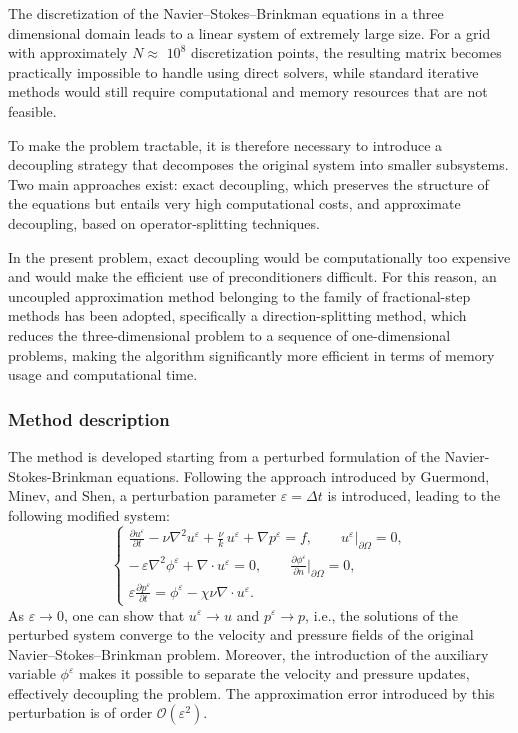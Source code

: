 \documentclass[12pt]{article}
\begin{document}
The discretization of the Navier–Stokes–Brinkman equations in a three dimensional domain leads to a linear system of extremely large size. For a grid with approximately $N \approx $ $10^8$  discretization points, the resulting matrix becomes practically impossible to handle using direct solvers, while standard iterative methods would still require computational and memory resources that are not feasible.

To make the problem tractable, it is therefore necessary to introduce a decoupling strategy that decomposes the original system into smaller subsystems. Two main approaches exist: exact decoupling, which preserves the structure of the equations but entails very high computational costs, and approximate decoupling, based on operator-splitting techniques.

In the present problem, exact decoupling would be computationally too expensive and would make the efficient use of preconditioners difficult. For this reason, an uncoupled approximation method belonging to the family of fractional-step methods has been adopted, specifically a direction-splitting method, which reduces the three-dimensional problem to a sequence of one-dimensional problems, making the algorithm significantly more efficient in terms of memory usage and computational time.
\subsubsection{Method description}

The method is developed starting from a perturbed formulation of the Navier-Stokes-Brinkman equations. 
Following the approach introduced by Guermond, Minev, and Shen, a perturbation parameter 
$\varepsilon = \Delta t$ is introduced, leading to the following modified system:
\[
\begin{cases}
\displaystyle 
\frac{\partial u^\varepsilon}{\partial t}
- \nu \nabla^2 u^\varepsilon 
+ \frac{\nu}{k}\, u^\varepsilon 
+ \nabla p^\varepsilon 
= f, 
\qquad 
u^\varepsilon|_{\partial\Omega} = 0, \\[10pt]
\displaystyle 
-\,\varepsilon \nabla^2 \phi^\varepsilon 
+ \nabla\!\cdot u^\varepsilon = 0,
\qquad 
\frac{\partial \phi^\varepsilon}{\partial n}\Big|_{\partial\Omega} = 0, \\[10pt]
\displaystyle 
\varepsilon \frac{\partial p^\varepsilon}{\partial t}
= \phi^\varepsilon 
- \chi \nu \nabla\!\cdot u^\varepsilon .
\end{cases}
\]
As $\varepsilon \to 0$, one can show that 
$u^\varepsilon \to u$ and $p^\varepsilon \to p$, i.e., the solutions of the perturbed system 
converge to the velocity and pressure fields of the original Navier--Stokes--Brinkman problem. 
Moreover, the introduction of the auxiliary variable $\phi^\varepsilon$ makes it possible 
to separate the velocity and pressure updates, effectively decoupling the problem. 
The approximation error introduced by this perturbation is of order $\mathcal{O}(\varepsilon^{2})$.
\end{document}
